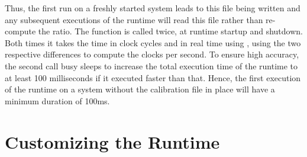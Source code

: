 Thus, the first run on a freshly started system leads to this file being written
and any subsequent executions of the runtime will read this file rather than
re-compute the ratio. The function
 is called twice, at
runtime startup and shutdown. Both times it takes the time in clock cycles and
in real time using , using the two respective
differences to compute the clocks per second. To ensure high accuracy, the
second call busy sleeps to increase the total execution time of the runtime to
at least 100 milliseconds if it executed faster than that. Hence, the first
execution of the runtime on a system without the calibration file in place will
have a minimum duration of 100ms.


\section{Customizing the Runtime}
